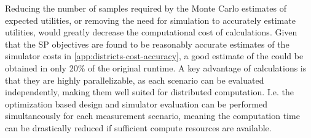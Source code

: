 \begin{subappendices}
    Reducing the number of samples required by the Monte Carlo estimates of expected utilities, or removing the need for simulation to accurately estimate utilities, would greatly decrease the computational cost of  calculations.
    Given that the SP objectives are found to be reasonably accurate estimates of the simulator costs in \ref{app:districts-cost-accuracy}, a good estimate of the  could be obtained in only 20\% of the original runtime.
    A key advantage of  calculations is that they are highly parallelizable, as each scenario can be evaluated independently, making them well suited for distributed computation. I.e. the optimization based design and simulator evaluation can be performed simultaneously for each measurement scenario, meaning the computation time can be drastically reduced if sufficient compute resources are available.

\end{subappendices}